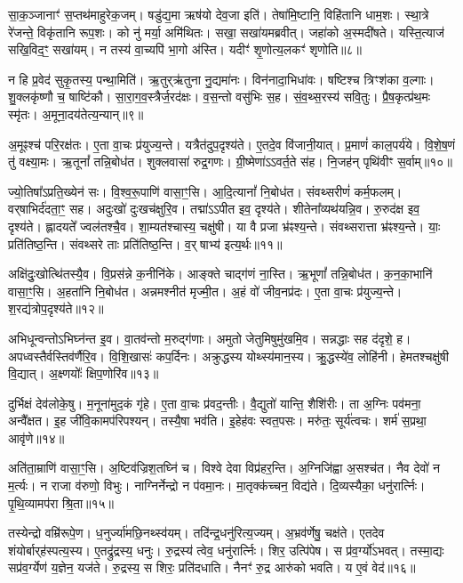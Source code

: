 सा॒क॒ञ्जानाꣳ॑ स॒प्तथ॑माहुरेक॒जम्। षडु॑द्य॒मा ऋष॑यो देव॒जा इति॑। 
तेषा॑मि॒ष्टानि॒ विहि॑तानि धाम॒शः। स्था॒त्रे रे॑जन्ते॒ विकृ॑तानि रूप॒शः। 
को नु॑ मर्या॒ अमि॑थितः। सखा॒ सखा॑यमब्रवीत्। 
जहा॑को अ॒स्मदी॑षते। यस्ति॒त्याज॑ सखि॒विद॒ꣳ॒ सखा॑यम्। 
न तस्य॑ वा॒च्यपि॑ भा॒गो अ॑स्ति। यदीꣳ॑ शृ॒णोत्य॒लकꣳ॑ शृणोति॥८॥

न हि प्र॒वेद॑ सुकृ॒तस्य॒ पन्था॒मिति॑। ऋ॒तुर्‌ऋ॑तुना नु॒द्यमा॑नः। 
विन॑नादा॒भिधा॑वः। षष्टिश्च त्रिꣳश॑का व॒ल्गाः। 
शु॒क्लकृ॑ष्णौ च॒ षाष्टि॑कौ। सा॒रा॒ग॒व॒स्त्रैर्ज॒रद॑क्षः। 
व॒स॒न्तो वसु॑भिः स॒ह। सं॒व॒थ्स॒रस्य॑ सवि॒तुः। 
प्रै॒ष॒कृत्प्र॑थ॒मः स्मृ॑तः। अ॒मूना॒दय॑तेत्य॒न्यान्॥९॥

अ॒मूꣴश्च॑ परि॒रक्ष॑तः। ए॒ता वा॒चः प्र॑युज्य॒न्ते। 
यत्रैत॑दुप॒दृश्य॑ते। ए॒तदे॒व वि॑जानी॒यात्। 
प्र॒माणं॑ काल॒पर्य॑ये। वि॒शे॒ष॒णं तु॑ वक्ष्या॒मः। 
ऋ॒तूनां᳚ तन्नि॒बोध॑त। शुक्लवासा॑ रुद्र॒गणः। 
ग्री॒ष्मेणा॑ऽऽवर्त॒ते स॑ह। नि॒जह॑न्‌ पृथि॑वीꣳ स॒र्वाम्॥१०॥

ज्यो॒तिषा᳚ऽप्रति॒ख्येन॑ सः। वि॒श्व॒रू॒पाणि॑ वासा॒ꣳ॒सि। 
आ॒दि॒त्यानां᳚ नि॒बोध॑त। संवथ्सरीणं॑ कर्म॒फलम्। 
वर्‌षाभिर्द॑दता॒ꣳ॒ सह। अदुःखो॑ दुःखच॑क्षुरि॒व। 
तद्मा॑ऽऽपीत इव॒ दृश्य॑ते। शीतेना᳚व्यथ॑यन्नि॒व। 
रु॒रुद॑क्ष इव॒ दृश्य॑ते। ह्लादयते᳚ ज्वल॑तश्चै॒व। 
शा॒म्यत॑श्चास्य॒ चक्षु॑षी। या वै प्रजा भ्र॑ꣴश्य॒न्ते। 
संवथ्सरात्ता भ्र॑ꣴश्य॒न्ते। याः॒ प्रति॑तिष्ठ॒न्ति। 
संवथ्सरे ताः प्रति॑तिष्ठ॒न्ति। व॒र्‌षाभ्य॑ इत्य॒र्थः॥११॥\anuvakamend


अक्षि॑दुः॒खोत्थि॑तस्यै॒व। वि॒प्रस॑न्ने क॒नीनि॑के। 
आङ्क्ते चाद्ग॑णं ना॒स्ति। ऋ॒भूणां᳚ तन्नि॒बोध॑त। 
क॒न॒का॒भानि॑ वासा॒ꣳ॒सि। अ॒हता॑नि नि॒बोध॑त। 
अन्नमश्नीत॑ मृज्मी॒त। अ॒हं वो॑ जीव॒नप्र॑दः। 
ए॒ता वा॒चः प्र॑युज्य॒न्ते। श॒रद्य॑त्रोप॒दृश्य॑ते॥१२॥

अभिधून्वन्तोऽभिघ्न॑न्त इ॒व। वा॒तव॑न्तो म॒रुद्ग॑णाः। 
अमुतो जेतुमिषुमु॑खमि॒व। सन्नद्धाः सह द॑दृशे॒ ह। 
अपध्वस्तैर्वस्तिव॑र्णैरि॒व। वि॒शि॒खासः॑ कप॒र्दिनः। 
अक्रुद्धस्य योथ्स्य॑मान॒स्य। क्रु॒द्धस्ये॑व॒ लोहि॑नी। 
हेमतश्चक्षु॑षी वि॒द्यात्। अ॒क्ष्णयोः᳚ क्षिप॒णोरि॑व॥१३॥

दुर्भिक्षं देव॑लोके॒षु। म॒नूना॑मुद॒कं गृ॑हे। 
ए॒ता वा॒चः प्र॑वद॒न्तीः। वै॒द्युतो॑ यान्ति॒ शैशि॑रीः। 
ता अ॒ग्निः पव॑मना॒ अन्वै᳚क्षत। इ॒ह जी॑वि॒कामप॑रिपश्यन्। 
तस्यै॒षा भव॑ति। इ॒हेह॑वः स्वत॒पसः। 
मरु॑तः॒ सूर्य॑त्वचः। शर्म॑ स॒प्रथा॒ आवृ॑णे॥१४॥\anuvakamend


अति॑ता॒म्राणि॑ वासा॒ꣳ॒सि। अ॒ष्टिव॑ज्रिश॒तघ्नि॑ च। 
विश्वे देवा विप्र॑हर॒न्ति। अ॒ग्निजि॑ह्वा अ॒सश्च॑त। 
नैव देवो॑ न म॒र्त्यः। न राजा व॑रुणो॒ विभुः। 
नाग्निर्नेन्द्रो न प॑वमा॒नः। मा॒तृक्क॑च्चन॒ विद्य॑ते। 
दि॒व्यस्यैका॒ धनु॑रार्त्निः। पृ॒थि॒व्यामप॑रा श्रि॒ता॥१५॥

तस्येन्द्रो वम्रि॑रूपे॒ण। ध॒नुर्ज्या॑मछि॒नथ्स्व॑यम्। 
तदि॑न्द्र॒धनु॑\-रित्य॒ज्यम्। अ॒भ्रव॑र्णेषु॒ चक्ष॑ते। 
एतदेव शंयोर्बार्‌ह॑स्पत्य॒स्य। ए॒तद्रु॑द्रस्य॒ धनुः। 
रु॒द्रस्य॑ त्वेव॒ धनु॑रार्त्निः। शिर॒ उत्पि॑पेष। 
स प्र॑व॒र्ग्यो॑ऽभवत्। तस्मा॒द्यः सप्र॑व॒र्ग्येण॑ य॒ज्ञेन॒ यज॑ते। 
रु॒द्रस्य॒ स शिरः॒ प्रति॑दधाति। नैनꣳ॑ रु॒द्र आरु॑को भवति। य ए॒वं वेद॑॥१६॥\anuvakamend


